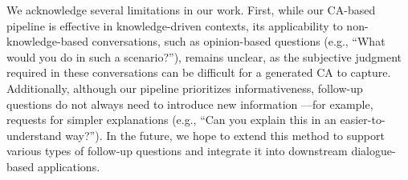 We acknowledge several limitations in our work. First, while our CA-based pipeline is effective in knowledge-driven contexts, its applicability to non-knowledge-based conversations, such as opinion-based questions (e.g., ``What would you do in such a scenario?''), remains unclear, as the subjective judgment required in these conversations can be difficult for a generated CA to capture. Additionally, although our pipeline prioritizes informativeness, follow-up questions do not always need to introduce new information \cite{kurkul2018question}---for example, requests for simpler explanations (e.g., ``Can you explain this in an easier-to-understand way?''). In the future, we hope to extend this method to support various types of follow-up questions and integrate it into downstream dialogue-based applications. 



